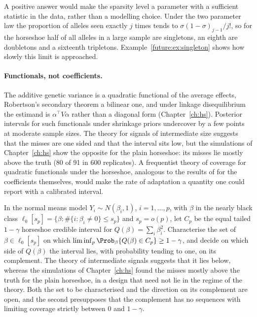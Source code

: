 A positive answer would make the sparsity level a parameter with a sufficient statistic in the
data, rather than a modelling choice. Under the two parameter law the proportion of alleles seen
exactly $j$ times tends to $\sigma(1-\sigma)_{j-1}/j!$, so for the horseshoe half of all alleles
in a large sample are singletons, an eighth are doubletons and a sixteenth tripletons. Example~\ref{future:ex:singleton} shows how slowly this limit is
approached.

\paragraph{Functionals, not coefficients.} The additive genetic variance is a quadratic functional
of the average effects, Robertson's secondary theorem a bilinear one, and under linkage
disequilibrium the estimand is $\alpha^\top V\alpha$ rather than a diagonal form
(Chapter~\ref{ch:hs}). Posterior intervals for such functionals under shrinkage priors undercover
by a few points at moderate sample sizes. The theory for signals of intermediate size suggests that the misses are one sided and that the interval sits low, but the simulations of Chapter~\ref{ch:hs} show the opposite for the plain horseshoe: its misses lie mostly above the truth (80 of 91 in 600 replicates). A frequentist
theory of coverage for quadratic functionals under the horseshoe, analogous to the results of
\citet{future:vanderpas2017} for the coefficients themselves, would make the rate of adaptation a
quantity one could report with a calibrated interval.

\begin{question}\label{future:q:quad}
In the normal means model $Y_i\sim N(\beta_i,1)$, $i=1,\dots,p$, with $\beta$ in the nearly black
class $\ell_0[s_p]=\{\beta:\#\{i:\beta_i\ne0\}\le s_p\}$ and $s_p=o(p)$, let $C_p$ be the
equal tailed $1-\gamma$ horseshoe credible interval for $Q(\beta)=\sum_i\beta_i^2$. Characterise
the set of $\beta\in\ell_0[s_p]$ on which $\liminf_p\Prob_\beta\{Q(\beta)\in C_p\}\ge1-\gamma$,
and decide on which side of $Q(\beta)$ the interval lies, with probability tending to
one, on its complement. The theory of intermediate signals suggests that it lies below, whereas the simulations of Chapter~\ref{ch:hs} found the misses mostly above the truth for the plain horseshoe, in a design that need not lie in the regime of the theory. Both the set to be characterised and the direction on its complement are open, and the second presupposes that the complement has no sequences with limiting coverage strictly between $0$ and $1-\gamma$.
\end{question}

